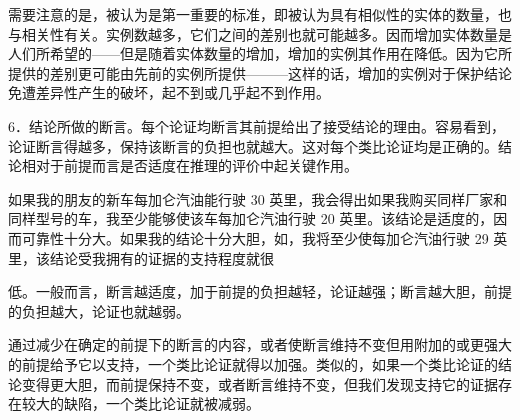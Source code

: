 需要注意的是，被认为是第一重要的标准，即被认为具有相似性的实体的数量，也与相关性有关。实例数越多，它们之间的差别也就可能越多。因而增加实体数量是人们所希望的——但是随着实体数量的增加，增加的实例其作用在降低。因为它所提供的差别更可能由先前的实例所提供———这样的话，增加的实例对于保护结论免遭差异性产生的破坏，起不到或几乎起不到作用。

6．结论所做的断言。每个论证均断言其前提给出了接受结论的理由。容易看到，论证断言得越多，保持该断言的负担也就越大。这对每个类比论证均是正确的。结论相对于前提而言是否适度在推理的评价中起关键作用。

如果我的朋友的新车每加仑汽油能行驶 30 英里，我会得出如果我购买同样厂家和同样型号的车，我至少能够使该车每加仑汽油行驶 20 英里。该结论是适度的，因而可靠性十分大。如果我的结论十分大胆，如，我将至少使每加仑汽油行驶 29 英里，该结论受我拥有的证据的支持程度就很

低。一般而言，断言越适度，加于前提的负担越轻，论证越强；断言越大胆，前提的负担越大，论证也就越弱。

通过减少在确定的前提下的断言的内容，或者使断言维持不变但用附加的或更强大的前提给予它以支持，一个类比论证就得以加强。类似的，如果一个类比论证的结论变得更大胆，而前提保持不变，或者断言维持不变，但我们发现支持它的证据存在较大的缺陷，一个类比论证就被减弱。 

